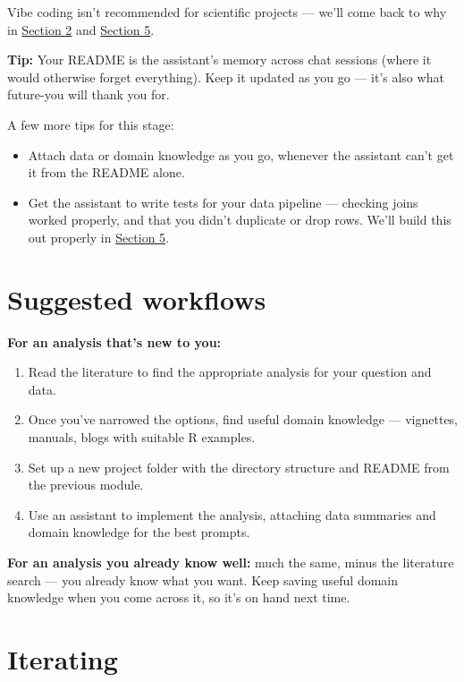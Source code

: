 \documentclass[
  letterpaper,
  DIV=11,
  numbers=noendperiod]{scrreprt}
\providecommand{\tightlist}{%
  \setlength{\itemsep}{0pt}\setlength{\parskip}{0pt}}
\begin{document}
Vibe coding isn't recommended for scientific projects --- we'll come
back to why in \hyperref[reviewing-agent-output]{Section 2} and
\href{../section-5-agentic-engineering/index.qmd}{Section 5}.

\textbf{Tip:} Your README is the assistant's memory across chat sessions
(where it would otherwise forget everything). Keep it updated as you go
--- it's also what future-you will thank you for.

A few more tips for this stage:

\begin{itemize}
\tightlist
\item
  Attach data or domain knowledge as you go, whenever the assistant
  can't get it from the README alone.
\item
  Get the assistant to write tests for your data pipeline --- checking
  joins worked properly, and that you didn't duplicate or drop rows.
  We'll build this out properly in
  \href{../section-5-agentic-engineering/index.qmd}{Section 5}.
\end{itemize}

\section{Suggested workflows}\label{suggested-workflows}

\textbf{For an analysis that's new to you:}

\begin{enumerate}
\def\labelenumi{\arabic{enumi}.}
\tightlist
\item
  Read the literature to find the appropriate analysis for your question
  and data.
\item
  Once you've narrowed the options, find useful domain knowledge ---
  vignettes, manuals, blogs with suitable R examples.
\item
  Set up a new project folder with the directory structure and README
  from the previous module.
\item
  Use an assistant to implement the analysis, attaching data summaries
  and domain knowledge for the best prompts.
\end{enumerate}

\textbf{For an analysis you already know well:} much the same, minus the
literature search --- you already know what you want. Keep saving useful
domain knowledge when you come across it, so it's on hand next time.

\section{Iterating}\label{iterating}
\end{document}
